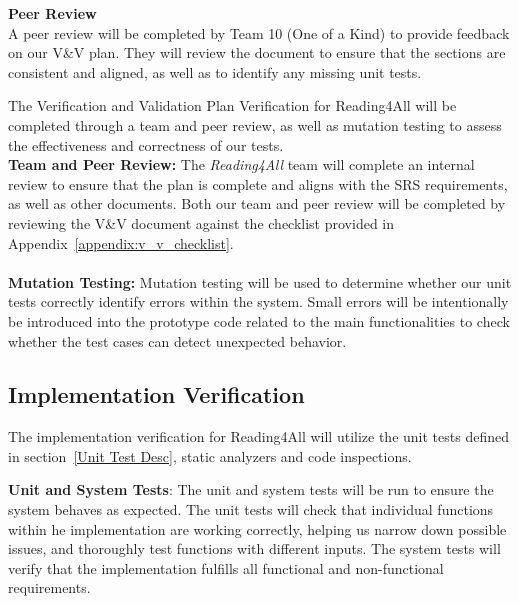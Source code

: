 \documentclass[12pt, titlepage]{article}
\begin{document}
\textbf{Peer Review}\\
A peer review will be completed by Team 10 (One of a Kind) to provide
feedback on our V\&V plan. They will review the document to ensure
that the sections are consistent and aligned, as well as to identify
any missing unit tests.

The Verification and Validation Plan Verification for Reading4All
will be completed through a team and peer review, as well as mutation
testing to assess the effectiveness and correctness of our tests. \\

\textbf{Team and Peer Review:}
The \textit{Reading4All} team will complete an internal review to
ensure that the plan is complete and aligns with the SRS
requirements, as well as other documents.
Both our team and peer review will be completed by reviewing the V\&V
document against the checklist provided in
Appendix~\ref{appendix:v_v_checklist}.   \\ \\

\textbf{Mutation Testing:}
Mutation testing will be used to determine whether our unit tests
correctly identify errors within the system.
Small errors will be intentionally be introduced into the prototype
code related to the main functionalities to check whether the test
cases can detect unexpected behavior.

\subsection{Implementation Verification}




The implementation verification for Reading4All will utilize the unit
tests defined in section~\ref{Unit Test Desc},
static analyzers and code inspections.

\textbf{Unit and System Tests}:
The unit and system tests will be run to ensure the system behaves as expected. The unit tests will check that individual functions within he implementation are working correctly, helping us narrow down possible issues, and thoroughly test functions with different inputs. 
The system tests will verify that the implementation fulfills all functional and non-functional requirements. \\
\end{document}
